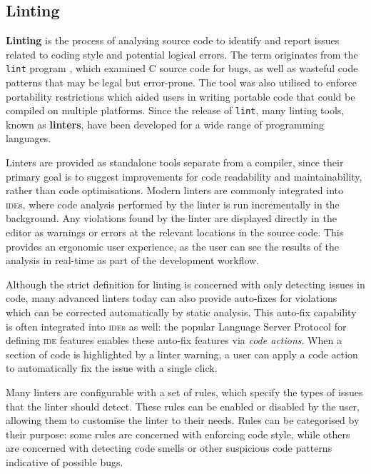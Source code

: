 \subsection{Linting}
\textbf{Linting} is the process of analysing source code to identify and report issues related to coding style and potential logical errors.
The term originates from the \texttt{lint} program \cite{johnson_lint_1978}, which examined C source code for bugs, as well as wasteful code patterns that may be legal but error-prone.
The tool was also utilised to enforce portability restrictions which aided users in writing portable code that could be compiled on multiple platforms.
Since the release of \texttt{lint}, many linting tools, known as \textbf{linters}, have been developed for a wide range of programming languages.

Linters are provided as standalone tools separate from a compiler, since their primary goal is to suggest improvements for code readability and maintainability, rather than code optimisations.
Modern linters are commonly integrated into \textsc{ide}s, where code analysis performed by the linter is run incrementally in the background.
Any violations found by the linter are displayed directly in the editor as warnings or errors at the relevant locations in the source code.
This provides an ergonomic user experience, as the user can see the results of the analysis in real-time as part of the development workflow.

Although the strict definition for linting is concerned with only detecting issues in code, many advanced linters today can also provide auto-fixes for violations which can be corrected automatically by static analysis.
This auto-fix capability is often integrated into \textsc{ide}s as well: the popular Language Server Protocol for defining \textsc{ide} features enables these auto-fix features via \textit{code actions}.
When a section of code is highlighted by a linter warning, a user can apply a code action to automatically fix the issue with a single click.

Many linters are configurable with a set of rules, which specify the types of issues that the linter should detect.
These rules can be enabled or disabled by the user, allowing them to customise the linter to their needs.
Rules can be categorised by their purpose: some rules are concerned with enforcing code style, while others are concerned with detecting code smells or other suspicious code patterns indicative of possible bugs.


